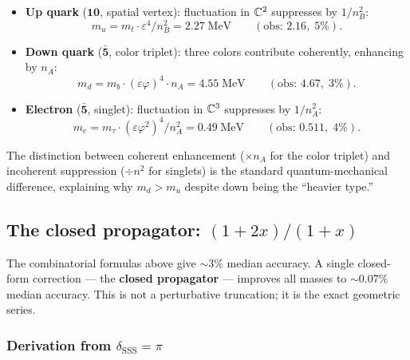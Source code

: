 \begin{itemize}
\item \textbf{Up quark} ($\mathbf{10}$, spatial vertex): fluctuation in $\mathbb{C}^2$ suppresses by $1/n_B^2$:
\begin{equation}
m_u = m_t \cdot \varepsilon^4 / n_B^2 = 2.27\;\text{MeV} \qquad (\text{obs: } 2.16,\; 5\%).
\end{equation}

\item \textbf{Down quark} ($\bar{\mathbf{5}}$, color triplet): three colors contribute coherently, enhancing by $n_A$:
\begin{equation}
m_d = m_b \cdot (\varepsilon\varphi)^4 \cdot n_A = 4.55\;\text{MeV} \qquad (\text{obs: } 4.67,\; 3\%).
\end{equation}

\item \textbf{Electron} ($\bar{\mathbf{5}}$, singlet): fluctuation in $\mathbb{C}^3$ suppresses by $1/n_A^2$:
\begin{equation}
m_e = m_\tau \cdot (\varepsilon\varphi^2)^4 / n_A^2 = 0.49\;\text{MeV} \qquad (\text{obs: } 0.511,\; 4\%).
\end{equation}
\end{itemize}

The distinction between coherent enhancement ($\times n_A$ for the color triplet) and incoherent suppression ($\div n^2$ for singlets) is the standard quantum-mechanical difference, explaining why $m_d > m_u$ despite down being the ``heavier type.''

\subsection{The closed propagator: $(1+2x)/(1+x)$}
\label{sec:closed_propagator}

The combinatorial formulas above give $\sim 3\%$ median accuracy.  A single closed-form correction --- the \textbf{closed propagator} --- improves all masses to $\sim 0.07\%$ median accuracy.  This is not a perturbative truncation; it is the exact geometric series.

\subsubsection{Derivation from $\delta_\mathrm{SSS} = \pi$}

